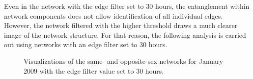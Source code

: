 
Even in the network with the edge filter set to 30 hours, the entanglement within network components does not allow identification of all individual edges. However, the network filtered with the higher threshold draws a much clearer image of the network structure. For that reason, the following analysis is carried out using networks with an edge filter set to 30 hours.


\begin{figure}[htpb]%
	\centering 
	\qquad 
	\qquad  
				
	\caption[Network visualizations of the same- and opposite-sex networks]{Visualizations of the same- and opposite-sex networks for January 2009 with the edge filter value set to 30 hours.}
	\label{fig:inner_inter_gender} 
	 
\end{figure}

